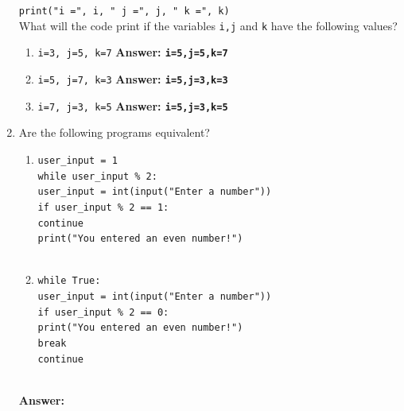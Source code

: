 \documentclass{article}
\begin{document}
\begin{enumerate}
\texttt{print("i =", i, " j =", j, " k =", k)}\\
What will the code print if the variables \texttt{i,j} and \texttt{k} have the following values?
\begin{enumerate}
	\item \texttt{i=3, j=5, k=7}
	{\color{ForestGreen}\bfseries Answer: 
		\texttt{i=5,j=5,k=7}}
	\item \texttt{i=5, j=7, k=3}
	{\color{ForestGreen}\bfseries Answer: 
		\texttt{i=5,j=3,k=3}}
	\item \texttt{i=7, j=3, k=5}
	{\color{ForestGreen}\bfseries Answer: 
		\texttt{i=5,j=3,k=5}}
\end{enumerate}
\item Are the following programs equivalent?
\begin{multicols}{2}
\begin{enumerate}
	\item \texttt{user\_input = 1}\\
	\texttt{while user\_input \% 2:}\\
		\null\quad\texttt{user\_input = int(input("Enter a number"))}\\
		\null\quad\texttt{if user\_input \% 2 == 1:}\\
			\null\quad\quad\texttt{continue}\\
			\null\quad\texttt{print("You entered an even number!")}\\
			\texttt{}\\
	\item \texttt{while True:}\\
	\null\quad\texttt{user\_input = int(input("Enter a number"))}\\
	\null\quad\texttt{if user\_input \% 2 == 0:}\\
		\null\quad\quad\texttt{print("You entered an even number!")}\\
		\null\quad\quad\texttt{break}\\
		\null\quad\texttt{continue}\\
		\null\quad\quad\texttt{}\\
\end{enumerate}
\end{multicols}
{\color{ForestGreen}\bfseries Answer: 
}
\end{enumerate}
\end{document}
